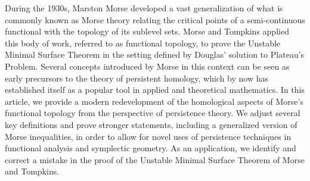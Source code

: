 During the 1930s, Marston Morse developed a vast generalization of what is commonly known as Morse theory relating the critical points of a semi-continuous functional with the topology of its sublevel sets.
Morse and Tompkins applied this body of work, referred to as functional topology, to prove the Unstable Minimal Surface Theorem in the setting defined by Douglas' solution to Plateau's Problem.
Several concepts introduced by Morse in this context can be seen as early precursors to the theory of persistent homology, which by now has established itself as a popular tool in applied and theoretical mathematics.
In this article, we provide a modern redevelopment of the homological aspects of Morse's functional topology from the perspective of persistence theory.
We adjust several key definitions and prove stronger statements, including a generalized version of Morse inequalities, in order to allow for novel uses of persistence techniques in functional analysis and symplectic geometry.
As an application, we identify and correct a mistake in the proof of the Unstable Minimal Surface Theorem of Morse and Tompkins.